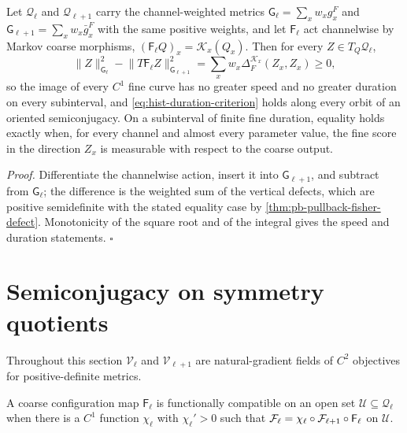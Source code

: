 Let $\mathcal Q_\ell$ and $\mathcal Q_{\ell+1}$ carry the channel-weighted metrics
$\mathsf G_\ell=\sum_xw_xg^F_x$ and $\mathsf G_{\ell+1}=\sum_xw_x\bar g^F_x$ with the same
positive weights, and let $\mathsf F_\ell$ act channelwise by Markov coarse morphisms,
$(\mathsf F_\ell Q)_x=\mathscr K_x(Q_x)$.  Then for every $Z\in T_Q\mathcal Q_\ell$,
\begin{equation}
\lVert Z\rVert^2_{\mathsf G_\ell}
-\lVert T\mathsf F_\ell Z\rVert^2_{\mathsf G_{\ell+1}}
=\sum_xw_x\Delta_F^{\mathscr K_x}(Z_x,Z_x)
\geq0,
\label{eq:hist-pointwise-contraction-lift}
\end{equation}
so the image of every $C^1$ fine curve has no greater speed and no greater duration on
every subinterval, and \eqref{eq:hist-duration-criterion} holds along every orbit of an
oriented semiconjugacy. On a subinterval of finite fine duration, equality holds exactly
when, for every channel and almost every parameter value, the fine score in the
direction $Z_x$ is measurable with respect to the coarse output.

\noindent\emph{Proof.}
Differentiate the channelwise action, insert it into $\mathsf G_{\ell+1}$, and subtract
from $\mathsf G_\ell$; the difference is the weighted sum of the vertical defects, which
are positive semidefinite with the stated equality case by
\cref{thm:pb-pullback-fisher-defect}.  Monotonicity of the square root and of the
integral gives the speed and duration statements.  $\square$

\section{Semiconjugacy on symmetry quotients}
\label{sec:hist-natural-gradient-semiconjugacy}

Throughout this section $\mathscr V_\ell$ and $\mathscr V_{\ell+1}$ are natural-gradient
fields of $C^2$ objectives for positive-definite metrics.

A coarse configuration map $\mathsf F_\ell$ is functionally compatible on an open set
$\mathcal U\subseteq\mathcal Q_\ell$ when there is a $C^1$ function $\chi_\ell$ with
$\chi_\ell'>0$ such that $\mathcal F_\ell=\chi_\ell\circ\mathcal F_{\ell+1}\circ\mathsf
F_\ell$ on $\mathcal U$.

